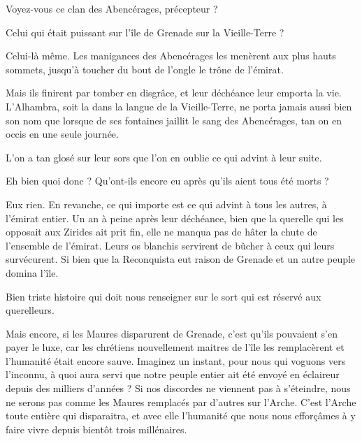 \begin{drama}

  \elenaspeaks Voyez-vous ce clan des Abencérages, précepteur ?

  \alexasspeaks Celui qui était puissant sur l’île de Grenade sur la Vieille-Terre ?

  \elenaspeaks Celui-là même. Les manigances des Abencérages les menèrent aux plus hauts sommets, jusqu’à toucher du bout de l’ongle le trône de l’émirat.

  \alexasspeaks Mais ils finirent par tomber en disgrâce, et leur déchéance leur emporta la vie. L’Alhambra, soit la  dans la langue de la Vieille-Terre, ne porta jamais aussi bien son nom que lorsque de ses fontaines jaillit le sang des Abencérages, tan on en occis en une seule journée.

  \elenaspeaks L’on a tan glosé sur leur sors que l’on en oublie ce qui advint à leur suite.

  \alexasspeaks Eh bien quoi donc ? Qu’ont-ils encore eu après qu’ils aient tous été morts ?

  \elenaspeaks Eux rien. En revanche, ce qui importe est ce qui advint à tous les autres, à l’émirat entier. Un an à peine après leur déchéance, bien que la querelle qui les opposait aux Zirides ait prit fin, elle ne manqua pas de hâter la chute de l’ensemble de l’émirat. Leurs os blanchis servirent de bûcher à ceux qui leurs survécurent. Si bien que la Reconquista eut raison de Grenade et un autre peuple domina l’île.

  \alexasspeaks Bien triste histoire qui doit nous renseigner sur le sort qui est réservé aux querelleurs.

  \elenaspeaks Mais encore, si les Maures disparurent de Grenade, c’est qu’ils pouvaient s’en payer le luxe, car les chrétiens nouvellement maitres de l’île les remplacèrent et l’humanité était encore sauve. Imaginez un instant, pour nous qui voguons vers l’inconnu, à quoi aura servi que notre peuple entier ait été envoyé en éclaireur depuis des milliers d’années ? Si nos discordes ne viennent pas à s’éteindre, nous ne serons pas comme les Maures remplacés par d’autres sur l’Arche. C’est l’Arche toute entière qui disparaitra, et avec elle l’humanité que nous nous efforçâmes à y faire vivre depuis bientôt trois millénaires.



\end{drama}
